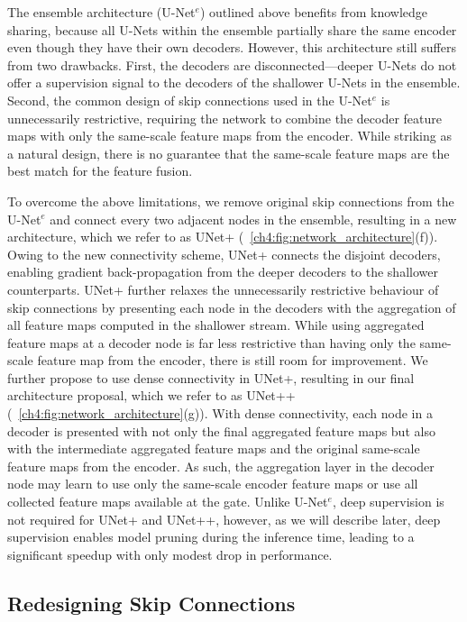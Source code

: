 The ensemble architecture (U-Net$^e$) outlined above benefits from knowledge sharing, because all U-Nets within the ensemble partially share the same encoder even though they have their own  decoders. However, this architecture still suffers from two drawbacks. First, the decoders are disconnected---deeper U-Nets do not offer a supervision signal to the decoders of the shallower U-Nets in the ensemble. Second, the common design of skip connections used in the U-Net$^e$ is unnecessarily restrictive, requiring the network to combine the decoder feature maps with only the same-scale feature maps from the encoder. While striking as a natural design,  there is no guarantee that the same-scale feature maps are the best match for the feature fusion. 

To overcome the above limitations, we remove original skip connections from the U-Net$^e$ and connect every two adjacent nodes in the ensemble, resulting in a new architecture, which we refer to as UNet+ (\figurename~\ref{ch4:fig:network_architecture}(f)). Owing to the new connectivity scheme, UNet+ connects the disjoint decoders, enabling gradient back-propagation from the deeper decoders to the shallower counterparts. UNet+ further relaxes the unnecessarily restrictive behaviour of skip connections by presenting each node in the decoders with the aggregation of all feature maps computed in the shallower stream. While using aggregated feature maps at a decoder node is far less restrictive than having only the same-scale feature map from the encoder,  there is still room for improvement. We further propose to use dense connectivity in UNet+,  resulting in our final architecture proposal, which we refer to as UNet++ (\figurename~\ref{ch4:fig:network_architecture}(g)). With dense connectivity, each node in a decoder is presented with not only the final aggregated feature maps but also with the intermediate aggregated feature maps and the original same-scale feature maps from the encoder. As such, the aggregation layer in the decoder node may learn to use only the same-scale encoder feature maps or use all collected feature maps available at the gate.
Unlike U-Net$^e$, deep supervision is not required for UNet+ and UNet++, however, as we will describe later, deep supervision enables model pruning during the inference time, leading to a significant speedup with only modest drop in  performance.

\subsection{Redesigning Skip Connections}
\label{ch4:model}

